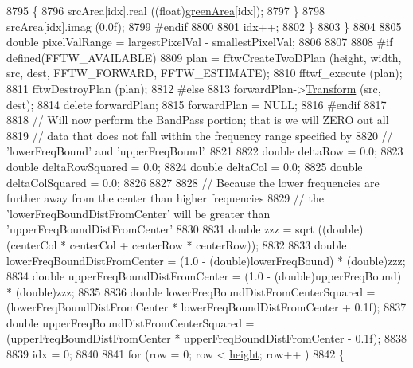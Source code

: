 \begin{DoxyCode}
8795         \{
8796           srcArea[idx].real ((\textcolor{keywordtype}{float})\hyperlink{class_k_k_b_1_1_raster_ad981258f1f7284a8bd0cd0466f328cdf}{greenArea}[idx]);
8797         \}
8798         srcArea[idx].imag (0.0f);
8799 \textcolor{preprocessor}{      #endif}
8800 
8801       idx++;
8802     \}            
8803   \}
8804 
8805   \textcolor{keywordtype}{double}  pixelValRange = largestPixelVal - smallestPixelVal;
8806 
8807 
8808 \textcolor{preprocessor}{  #if  defined(FFTW\_AVAILABLE)}
8809     plan = fftwCreateTwoDPlan (height, width, src, dest, FFTW\_FORWARD, FFTW\_ESTIMATE);
8810     fftwf\_execute (plan);
8811     fftwDestroyPlan (plan);
8812 \textcolor{preprocessor}{  #else}
8813     forwardPlan->\hyperlink{class_k_k_b_1_1_k_k___d_f_t2_d_aa9bdc656e7af618c93047386e374e11b}{Transform} (src, dest);
8814     \textcolor{keyword}{delete}  forwardPlan;
8815     forwardPlan = NULL;
8816 \textcolor{preprocessor}{  #endif}
8817     
8818   \textcolor{comment}{//  Will now perform the BandPass portion;  that is we will ZERO out all }
8819   \textcolor{comment}{// data that does not fall within the frequency range specified by}
8820   \textcolor{comment}{// 'lowerFreqBound' and 'upperFreqBound'.}
8821     
8822   \textcolor{keywordtype}{double}  deltaRow        = 0.0;
8823   \textcolor{keywordtype}{double}  deltaRowSquared = 0.0;
8824   \textcolor{keywordtype}{double}  deltaCol        = 0.0;
8825   \textcolor{keywordtype}{double}  deltaColSquared = 0.0;
8826 
8827 
8828   \textcolor{comment}{// Because the lower frequencies are further away from the center than higher frequencies}
8829   \textcolor{comment}{// the 'lowerFreqBoundDistFromCenter' will be greater than 'upperFreqBoundDistFromCenter'}
8830   
8831   \textcolor{keywordtype}{double}  zzz = sqrt ((\textcolor{keywordtype}{double})(centerCol * centerCol + centerRow * centerRow));
8832 
8833   \textcolor{keywordtype}{double}  lowerFreqBoundDistFromCenter = (1.0 - (double)lowerFreqBound) * (double)zzz;
8834   \textcolor{keywordtype}{double}  upperFreqBoundDistFromCenter = (1.0 - (double)upperFreqBound) * (double)zzz;
8835 
8836   \textcolor{keywordtype}{double}  lowerFreqBoundDistFromCenterSquared = (lowerFreqBoundDistFromCenter * 
      lowerFreqBoundDistFromCenter + 0.1f);
8837   \textcolor{keywordtype}{double}  upperFreqBoundDistFromCenterSquared = (upperFreqBoundDistFromCenter * 
      upperFreqBoundDistFromCenter - 0.1f);
8838 
8839   idx = 0;
8840 
8841   \textcolor{keywordflow}{for}  (row = 0; row < \hyperlink{class_k_k_b_1_1_raster_af39ff189de4fbb6de98392e187efafb7}{height}; row++ )
8842   \{

\end{DoxyCode}
